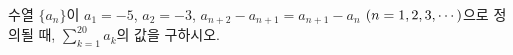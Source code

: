 수열 $\{a_n\}$이 $a_1=-5$, $a_2=-3$, $a_{n+2}-a_{n+1}=a_{n+1}-a_n$ $(n=1{,}\mkern3mu\mathopen{}2{,}\mkern3mu\mathopen{}3{,}\mkern3mu\mathopen{}\cdots)$으로 정의될 때, $\displaystyle\sum_{k=1}^{20}a_k$의 값을 구하시오.
